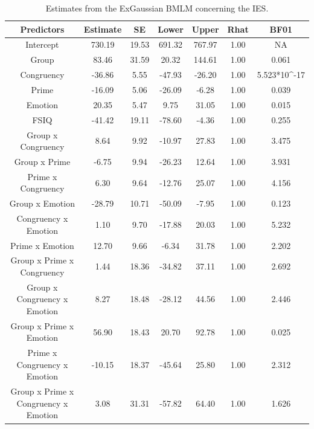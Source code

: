 \documentclass[
  11pt,
  english,
  ,doc,floatsintext]{apa6}
\begin{document}
\begin{table}[tbp]

\begin{center}
\begin{threeparttable}

\caption{\label{tab:summaryIBMf}Estimates from the ExGaussian BMLM concerning the IES.}

\small{

\begin{tabular}{ccccccc}
\toprule
Predictors & \multicolumn{1}{c}{Estimate} & \multicolumn{1}{c}{SE} & \multicolumn{1}{c}{Lower} & \multicolumn{1}{c}{Upper} & \multicolumn{1}{c}{Rhat} & \multicolumn{1}{c}{BF01}\\
\midrule
Intercept & 730.19 & 19.53 & 691.32 & 767.97 & 1.00 & NA\\
Group & 83.46 & 31.59 & 20.32 & 144.61 & 1.00 & 0.061\\
Congruency & -36.86 & 5.55 & -47.93 & -26.20 & 1.00 & 5.523*10\textasciicircum{}-17\\
Prime & -16.09 & 5.06 & -26.09 & -6.28 & 1.00 & 0.039\\
Emotion & 20.35 & 5.47 & 9.75 & 31.05 & 1.00 & 0.015\\
FSIQ & -41.42 & 19.11 & -78.60 & -4.36 & 1.00 & 0.255\\
Group x Congruency & 8.64 & 9.92 & -10.97 & 27.83 & 1.00 & 3.475\\
Group x Prime & -6.75 & 9.94 & -26.23 & 12.64 & 1.00 & 3.931\\
Prime x Congruency & 6.30 & 9.64 & -12.76 & 25.07 & 1.00 & 4.156\\
Group x Emotion & -28.79 & 10.71 & -50.09 & -7.95 & 1.00 & 0.123\\
Congruency x Emotion & 1.10 & 9.70 & -17.88 & 20.03 & 1.00 & 5.232\\
Prime x Emotion & 12.70 & 9.66 & -6.34 & 31.78 & 1.00 & 2.202\\
Group x Prime x Congruency & 1.44 & 18.36 & -34.82 & 37.11 & 1.00 & 2.692\\
Group x Congruency x Emotion & 8.27 & 18.48 & -28.12 & 44.56 & 1.00 & 2.446\\
Group x Prime x Emotion & 56.90 & 18.43 & 20.70 & 92.78 & 1.00 & 0.025\\
Prime x Congruency x Emotion & -10.15 & 18.37 & -45.64 & 25.80 & 1.00 & 2.312\\
Group x Prime x Congruency x Emotion & 3.08 & 31.31 & -57.82 & 64.40 & 1.00 & 1.626\\
\bottomrule
\end{tabular}

}

\end{threeparttable}
\end{center}

\end{table}
\end{document}
